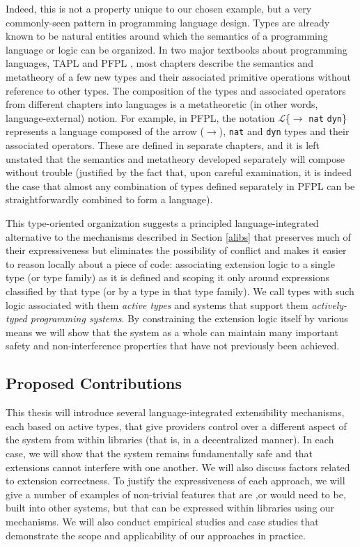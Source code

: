 Indeed, this is not a property unique to our chosen example, but a very commonly-seen pattern in programming language design. Types are already known to be natural entities around which the semantics of a programming language or logic can be organized. In two major textbooks about programming languages, TAPL \cite{tapl} and PFPL \cite{pfpl}, most chapters describe the semantics and metatheory of a few new types and their associated primitive operations without reference to other types. The composition of the types and associated operators from different chapters into languages is a metatheoretic (in other words, language-external) notion. For example, in PFPL, the notation $\mathcal{L}$\{$\rightarrow$ \verb|nat| \verb|dyn|\} represents a language composed of the arrow ($\rightarrow$), \verb|nat| and \verb|dyn| types and their associated operators. These are defined in separate chapters, and it is  left unstated that the semantics and metatheory developed separately will compose without trouble (justified by the fact that, upon careful examination, it is indeed the case that almost any combination of types defined separately in PFPL can be straightforwardly combined to form a language). 

This type-oriented organization suggests a principled language-integrated alternative to the mechanisms described in Section \ref{alibs} that preserves much of their expressiveness but eliminates the possibility of conflict and makes it easier to reason locally about a piece of code: associating extension logic to a single type (or type family) as it is defined and scoping it only around expressions classified by that type (or by a type in that type family).  We call types with such logic associated with them \emph{active types} and systems that support them \emph{actively-typed programming systems}. By constraining the extension logic itself by various means we will show that the system as a whole can maintain many important safety and non-interference properties that have not previously been achieved.

\subsection{Proposed Contributions}
This thesis will introduce several language-integrated extensibility mechanisms, each based on active types, that give providers control over a different aspect of the system from within libraries (that is, in a decentralized manner). In each case, we will show that the system remains fundamentally safe and that extensions cannot interfere with one another. We will also discuss factors related to extension correctness. To justify the  expressiveness of each approach, we will give a number of examples of non-trivial features that are ,or would need to be, built into other systems, but that can be expressed within libraries using our mechanisms. We will also conduct empirical studies and case studies that demonstrate the scope and applicability of our approaches in practice.

